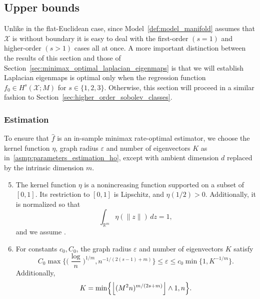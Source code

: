 \documentclass[aos]{imsart}
\theoremstyle{plain}
\theoremstyle{definition}
\theoremstyle{remark}
\def\R{\mathbb{R}}
\newcommand{\wh}[1]{\widehat{#1}}
\newcommand{\mc}[1]{\mathcal{#1}}
\newcommand{\Reals}{\mathbb{R}} %
\newcommand{\floor}[1]{\left\lfloor #1 \right\rfloor}
\newcommand{\1}{\mathbf{1}}
\begin{document}
\subsection{Upper bounds}
Unlike in the flat-Euclidean case, since Model~\ref{def:model_manifold} assumes that $\mc{X}$ is without boundary it is easy to deal with the first-order $(s = 1)$ and higher-order $(s > 1)$ cases all at once. A more important distinction between the results of this section and those of Section~\ref{sec:minimax_optimal_laplacian_eigenmaps} is that we will establish Laplacian eigenmaps is optimal only when the regression function $f_0 \in H^s(\mc{X};M)$ for $s \in \{1,2,3\}$. Otherwise, this section will proceed in a similar fashion to Section~\ref{sec:higher_order_sobolev_classes}.

\subsubsection{Estimation}
To ensure that $\wh{f}$ is an in-sample minimax rate-optimal estimator, we choose the kernel function $\eta$, graph radius $\varepsilon$ and number of eigenvectors $K$ as in~\ref{asmp:parameters_estimation_ho}, except with ambient dimension $d$ replaced by the intrinsic dimension $m$.

\begin{enumerate}[label=(P\arabic*)]
	\setcounter{enumi}{4}
	\item 
	\label{asmp:kernel_manifold}
	The kernel function $\eta$ is a nonincreasing function supported on a subset of $[0,1]$. Its restriction to $[0,1]$ is Lipschitz, and $\eta(1/2) > 0$. Additionally, it is normalized so that
	\begin{equation*}
	\int_{\Reals^m} \eta(\|z\|) \,dz = 1,
	\end{equation*}
	and we assume \smash{$\int_{\Reals^m} \|x\|^2 \eta(\|x\|) \,dx < \infty$}.
	\item 
	\label{asmp:parameters_estimation_manifold}
	For constants $c_0,C_0$, the graph radius $\varepsilon$ and number of eigenvectors $K$ satisfy
	\begin{equation}
	\label{eqn:radius_estimation_manifold}
	C_0\max\biggl\{\biggl(\frac{\log}{n}\biggr)^{1/m}, n^{-1/(2(s - 1) + m)}\biggr\} \leq \varepsilon \leq c_0\min\{1, K^{-1/m}\}.
	\end{equation}
	Additionally,
	\begin{equation*}
	K = \min\Bigl\{\floor{(M^2n)^{m/(2s + m)}} \wedge 1,n \Bigr\}.
	\end{equation*}
\end{enumerate}
\end{document}
